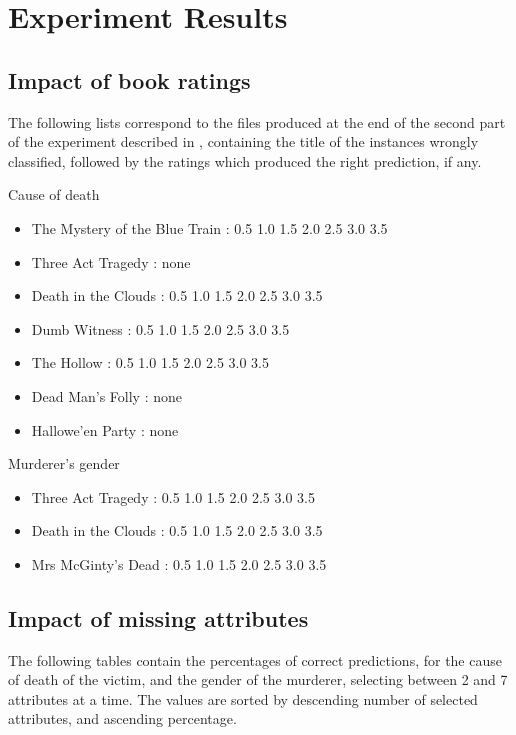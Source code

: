 \documentclass{mproj}
\begin{document}
\chapter{Experiment Results}\label{results}

\section{Impact of book ratings}

The following lists correspond to the files produced at the end of the second part of the experiment described in , containing the title of the instances wrongly classified, followed by the ratings which produced the right prediction, if any.

Cause of death
\begin{itemize}[topsep=0pt]
	\item[] The Mystery of the Blue Train : 0.5 1.0 1.5 2.0 2.5 3.0 3.5 
	\item[] Three Act Tragedy : none
	\item[] Death in the Clouds : 0.5 1.0 1.5 2.0 2.5 3.0 3.5 
	\item[] Dumb Witness : 0.5 1.0 1.5 2.0 2.5 3.0 3.5 
	\item[] The Hollow : 0.5 1.0 1.5 2.0 2.5 3.0 3.5 
	\item[] Dead Man's Folly : none
	\item[] Hallowe'en Party : none
\end{itemize}

Murderer's gender
\begin{itemize}[topsep=0pt]
	\item[] Three Act Tragedy : 0.5 1.0 1.5 2.0 2.5 3.0 3.5 
	\item[] Death in the Clouds : 0.5 1.0 1.5 2.0 2.5 3.0 3.5 
	\item[] Mrs McGinty's Dead : 0.5 1.0 1.5 2.0 2.5 3.0 3.5 	
\end{itemize}

\section{Impact of missing attributes}

The following tables contain the percentages of correct predictions, for the cause of death of the victim, and the gender of the murderer, selecting between 2 and 7 attributes at a time. The values are sorted by descending number of selected attributes, and ascending percentage.
\end{document}
